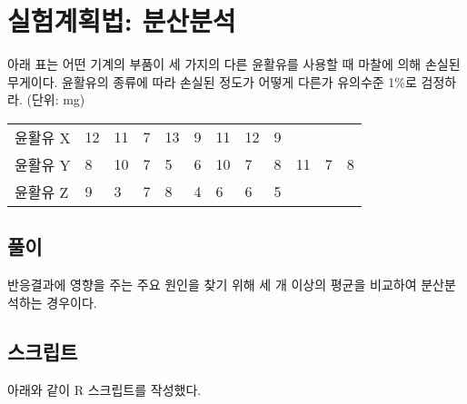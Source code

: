 \section{실험계획법: 분산분석}
아래 표는 어떤 기계의 부품이 세 가지의 다른 윤활유를 사용할 때 마찰에
의해 손실된 무게이다. 윤활유의 종류에 따라 손실된 정도가 어떻게 다른가
유의수준 1\%로 검정하라. {\small(단위: mg)}

\begin{tabularx}{0.9\textwidth}{ l|XXXXXXXXXXX }
  \noalign{\smallskip}\hline\noalign{\smallskip}
  윤활유 X & 12 & 11 & 7 & 13 & 9 & 11 & 12 & 9 \\
  윤활유 Y & 8 & 10 & 7 & 5 & 6 & 10 & 7 & 8 & 11 & 7 & 8\\
  윤활유 Z & 9 & 3 & 7 & 8 & 4 & 6 & 6 & 5
\end{tabularx}

\subsection{풀이}

반응결과에 영향을 주는 주요 원인을 찾기 위해 세 개 이상의 평균을 비교하여
분산분석하는 경우이다.


\subsection{스크립트}
아래와 같이 R 스크립트를 작성했다.




